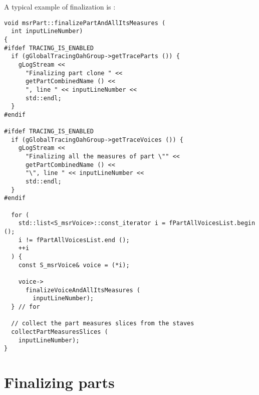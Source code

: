 A typical example of \cascading finalization is :
\begin{lstlisting}[language=CPlusPlus]
void msrPart::finalizePartAndAllItsMeasures (
  int inputLineNumber)
{
#ifdef TRACING_IS_ENABLED
  if (gGlobalTracingOahGroup->getTraceParts ()) {
    gLogStream <<
      "Finalizing part clone " <<
      getPartCombinedName () <<
      ", line " << inputLineNumber <<
      std::endl;
  }
#endif

#ifdef TRACING_IS_ENABLED
  if (gGlobalTracingOahGroup->getTraceVoices ()) {
    gLogStream <<
      "Finalizing all the measures of part \"" <<
      getPartCombinedName () <<
      "\", line " << inputLineNumber <<
      std::endl;
  }
#endif

  for (
    std::list<S_msrVoice>::const_iterator i = fPartAllVoicesList.begin ();
    i != fPartAllVoicesList.end ();
    ++i
  ) {
    const S_msrVoice& voice = (*i);

    voice->
      finalizeVoiceAndAllItsMeasures (
        inputLineNumber);
  } // for

  // collect the part measures slices from the staves
  collectPartMeasuresSlices (
    inputLineNumber);
}
\end{lstlisting}


\section{Finalizing parts}

